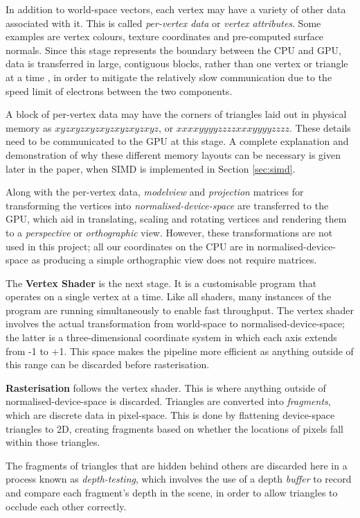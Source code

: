 \documentclass[11pt, a4paper, twocolumn]{article}
\begin{document}
In addition to world-space vectors, each vertex may have a variety of other data associated with it. This is called \emph{per-vertex data} or \emph{vertex attributes}. Some examples are vertex colours, texture coordinates and pre-computed surface normals. Since this stage represents the boundary between the CPU and GPU, data is transferred in large, contiguous blocks, rather than one vertex or triangle at a time \citep{NvidiaBatch}, in order to mitigate the relatively slow communication due to the speed limit of electrons between the two components.

A block of per-vertex data may have the corners of triangles laid out in physical memory as $xyzxyzxyzxyzxyzxyzxyz$, or $xxxxyyyyzzzzxxxyyyyzzzz$. These details need to be communicated to the GPU at this stage. A complete explanation and demonstration of why these different memory layouts can be necessary is given later in the paper, when SIMD is implemented in Section \ref{sec:simd}.

Along with the per-vertex data, \emph{modelview} and \emph{projection} matrices for transforming the vertices into \emph{normalised-device-space} are transferred to the GPU, which aid in translating, scaling and rotating vertices and rendering them to a \emph{perspective} or \emph{orthographic} view. However, these transformations are not used in this project; all our coordinates on the CPU are in normalised-device-space as producing a simple orthographic view does not require matrices.

The \textbf{Vertex Shader} is the next stage. It is a customisable program that operates on a single vertex at a time. Like all shaders, many instances of the program are running simultaneously to enable fast throughput. The vertex shader involves the actual transformation from world-space to normalised-device-space; the latter is a three-dimensional coordinate system in which each axis extends from -1 to +1. This space makes the pipeline more efficient as anything outside of this range can be discarded before rasterisation.

\textbf{Rasterisation} follows the vertex shader. This is where anything outside of normalised-device-space is discarded. Triangles are converted into \emph{fragments}, which are discrete data in pixel-space. This is done by flattening device-space triangles to 2D, creating fragments based on whether the locations of pixels fall within those triangles.

The fragments of triangles that are hidden behind others are discarded here in a process known as \emph{depth-testing}, which involves the use of a depth \emph{buffer} to record and compare each fragment's depth in the scene, in order to allow triangles to occlude each other correctly.
\end{document}

